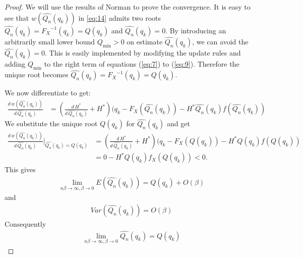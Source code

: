 \documentclass[10pt, a4paper]{article}
\newtheorem{rational for conjecture}{Rational for Conjecture}
\begin{document}
\begin{proof}
We will use the results of Norman to prove the convergence. It is easy to see that $w\left(\widehat{Q_{n}}(q_{k})\right)$ in \eqref{eq:14} admits two roots $\widehat{Q_n}(q_k) = {F_X}^{-1}(q_k) = Q(q_k)$ and $\widehat{Q_n}(q_k) = 0$.
By introducing an arbitrarily small lower bound $Q_{\text{min}}>0$ on estimate $\widehat{Q_{n}}(q_{k})$, we can avoid the $\widehat{Q_n}(q_k)=0$.
This is easily implemented by modifying the update rules and adding $Q_{\text{min}}$ to the right term of equations (\ref{eq:7}) to (\ref{eq:9}). Therefore the unique root becomes $\widehat{Q_n}(q_k)={F_X}^{-1}(q_k) = Q(q_k)$.

We now differentiate to get:
\begin{align*}
\frac{d\, w\left(\widehat{Q_{n}}(q_{k})\right)}{d\, \widehat{Q_{n}}(q_{k}) } &=  \left( \frac{d\, H^{\ast}}{d\, \widehat{Q_{n}}(q_{k})} + H^{\ast} \right)(q_k - F_X\left( \widehat{Q_{n}}(q_{k}) \right) - H^{\ast} \widehat{Q_{n}}(q_{k}) f\left(\widehat{Q_{n}}(q_{k})\right)
\end{align*}
We substitute the unique root $Q(q_k)$ for $\widehat{Q_{n}}(q_{k})$ and get
\begin{align*}
\frac{ d\, w\left(\widehat{Q_{n}}(q_{k})\right) }{d\, \widehat{Q_{n}}(q_{k})} \bigg|_{\widehat{Q_{n}}(q_{k})=Q(q_k)} &=  \left( \frac{d\, H^{\ast}}{d\, \widehat{Q_{n}}(q_{k})} + H^{\ast} \right)(q_k - F_X\left( Q(q_{k}) \right) - H^{\ast} Q(q_{k}) f\left(Q(q_{k})\right)  \\
&=  0-H^{\ast} Q(q_k) f_X(Q(q_k))<0.
\end{align*}
This gives
\begin{align*}
  \lim_{n \beta  \to \infty, \beta \to 0}  E\left(\widehat{Q_n}(q_k)\right)=Q(q_k)+O(\beta)
\end{align*}
and
\begin{align*}
Var\left(\widehat{Q_n}(q_k)\right)=O(\beta)
\end{align*}
Consequently
\begin{align*}
  \lim_{n \beta  \to \infty, \beta \to 0}  \widehat{Q_n}(q_k)=Q(q_k)
\end{align*}
\end{proof}
\end{document}

